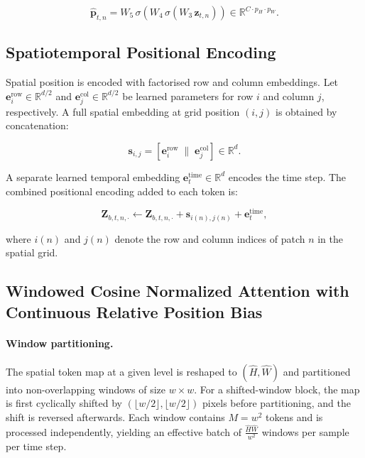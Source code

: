 \begin{equation}
    \hat{\mathbf{p}}_{t,n} = W_5 \, \sigma\!\left(W_4 \, \sigma\!\left(W_3 \, \mathbf{z}_{t,n}\right)\right) \in \mathbb{R}^{C \cdot p_H \cdot p_W}.
\end{equation}

\subsection{Spatiotemporal Positional Encoding}

Spatial position is encoded with factorised row and column embeddings. Let $\mathbf{e}^{\text{row}}_i \in \mathbb{R}^{d/2}$ and $\mathbf{e}^{\text{col}}_j \in \mathbb{R}^{d/2}$ be learned parameters for row $i$ and column $j$, respectively. A full spatial embedding at grid position $(i,j)$ is obtained by concatenation:

\begin{equation}
    \mathbf{s}_{i,j} = \left[\mathbf{e}^{\text{row}}_i \;\|\; \mathbf{e}^{\text{col}}_j\right] \in \mathbb{R}^{d}.
\end{equation}

A separate learned temporal embedding $\mathbf{e}^{\text{time}}_t \in \mathbb{R}^{d}$ encodes the time step. The combined positional encoding added to each token is:

\begin{equation}
    \mathbf{Z}_{b,t,n,\cdot} \leftarrow \mathbf{Z}_{b,t,n,\cdot} + \mathbf{s}_{i(n),j(n)} + \mathbf{e}^{\text{time}}_t,
\end{equation}

where $i(n)$ and $j(n)$ denote the row and column indices of patch $n$ in the spatial grid.

\subsection{Windowed Cosine Normalized Attention with Continuous Relative Position Bias}

\paragraph{Window partitioning.}
The spatial token map at a given level is reshaped to $(\hat{H}, \hat{W})$ and partitioned into non-overlapping windows of size $w \times w$. For a shifted-window block, the map is first cyclically shifted by $(\lfloor w/2 \rfloor, \lfloor w/2 \rfloor)$ pixels before partitioning, and the shift is reversed afterwards. Each window contains $M = w^2$ tokens and is processed independently, yielding an effective batch of $\frac{\hat{H}\hat{W}}{w^2}$ windows per sample per time step.

